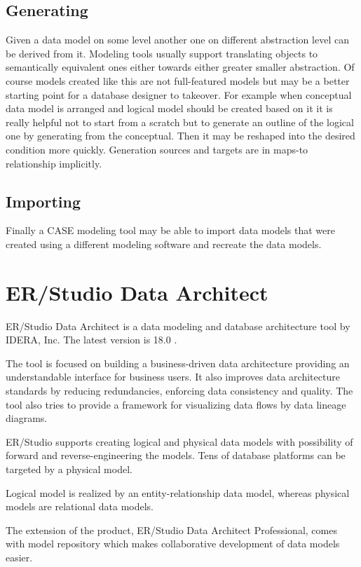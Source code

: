 \subsection{Generating}
Given a data model on some level another one on different abstraction level can be derived from it. Modeling tools usually support translating objects to semantically equivalent ones either towards either greater smaller abstraction. Of course models created like this are not full-featured models but may be a better starting point for a database designer to takeover. For example when conceptual data model is arranged and logical model should be created based on it it is really helpful not to start from a scratch but to generate an outline of the logical one by generating from the conceptual. Then it may be reshaped into the desired condition more quickly. Generation sources and targets are in maps-to relationship implicitly.

\subsection{Importing}
Finally a CASE modeling tool may be able to import data models that were created using a different modeling software and recreate the data models.

\section{ER/Studio Data Architect}

ER/Studio Data Architect is a data modeling and database architecture tool by IDERA, Inc. 
The latest version is 18.0 \cite{ErStudio}.

The tool is focused on building a business-driven data architecture providing an understandable interface for business users. It also improves data architecture standards by reducing redundancies, enforcing data consistency and quality.
The tool also tries to provide a framework for visualizing data flows by data lineage diagrams. 

ER/Studio supports creating logical and physical data models with possibility of forward and reverse-engineering the models. Tens of database platforms can be targeted by a physical model.

Logical model is realized by an entity-relationship data model, whereas physical models are relational data models.

The  extension of the product, ER/Studio Data Architect Professional, comes with model repository which makes collaborative development of data models easier. 

